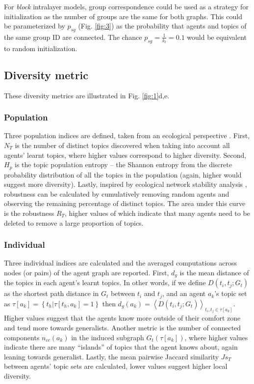 \documentclass{svproc}
\begin{document}
For \textit{block} intralayer models, group correspondence could be used as a strategy for initialization as the number of groups are the same for both graphs.
This could be parameterized by $p_{sg}$ (Fig. \ref{fig:3}) as the probability that agents and topics of the same group ID are connected.
The chance $p_{sg} = \frac{1}{k_t} = 0.1$ would be equivalent to random initialization.

\subsection{Diversity metric} \label{sec:method-diversity}

These diversity metrics are illustrated in Fig. \ref{fig:1}d,e.

\vspace{-1em}
\subsubsection*{Population}

Three population indices are defined, taken from an ecological perspective \cite{Tuomisto2010-pr}.
First, $N_T$ is the number of distinct topics discovered when taking into account all agents' learnt topics, where higher values correspond to higher diversity.
Second, $H_p$ is the topic population entropy -- the Shannon entropy from the discrete probability distribution of all the topics in the population (again, higher would suggest more diversity).
Lastly, inspired by ecological network stability analysis \cite{Memmott2004-os}, robustness can be calculated by
    cumulatively removing random agents
    and observing the remaining percentage of distinct topics.
The area under this curve is the robustness $R_T$, higher values of which indicate that many agents need to be deleted to remove a large proportion of topics.

\vspace{-1em}
\subsubsection*{Individual}

Three individual indices are calculated and the averaged computations across nodes (or pairs) of the agent graph are reported.
First, $d_g$ is the mean distance of the topics in each agent's learnt topics.
In other words, if we define
    $D(t_i,t_j;G_t)$ as the shortest path distance in $G_t$ between $t_i$ and $t_j$,
    and an agent $a_k$'s topic set as $\tau[a_k] = \left\{t_h | \tau[t_h,a_k] = 1 \right\}$
    then $d_g(a_k) = \left\langle D(t_i,t_j;G_t)\right\rangle_{t_i, t_j \in \tau[a_k]}$.
Higher values suggest that the agents know more outside of their comfort zone and tend more towards generalists.
Another metric is the number of connected components $n_{cc}(a_k)$ in the induced subgraph $G_t(\tau[a_k])$,
    where higher values indicate there are many ``islands'' of topics that the agent knows about, again leaning towards generalist.
Lastly, the mean pairwise Jaccard similarity $Js_T$ between agents' topic sets are calculated, lower values suggest higher local diversity.
\end{document}
